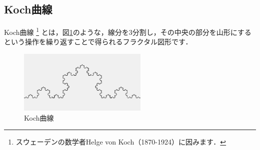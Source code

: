 \documentclass[dvipdfmx]{jsarticle}
\theoremstyle{definition}
\begin{document}
\subsection{Koch曲線}  \label{subsec_koch_curve}
Koch曲線
\footnote{
    スウェーデンの数学者Helge von Koch（1870-1924）に因みます．
}
とは，図\ref{pic_koch_curve}のような，線分を3分割し，その中央の部分を山形にするという操作を繰り返すことで得られるフラクタル図形です．
%
\begin{figure}[H]
    \centering
    \includegraphics[width=0.55\textwidth]{figure/koch/koch_curve.png}
    \caption{Koch曲線}
    \label{pic_koch_curve}
\end{figure}
\end{document}
